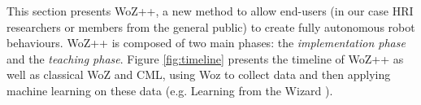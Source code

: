 \documentclass[manuscript, review, anonymous]{acmart}
\newcommand{\ES}[1]{\added[id=ES]{#1}}
\newcommand{\woz}{WoZ++\xspace}
\begin{document}


%	


This section presents \woz, a new method to allow end-users (in our case HRI
researchers or members from the general public) to create fully autonomous robot
behaviours. \woz is composed of two main phases: the \emph{implementation phase} and the \emph{teaching phase}. Figure \ref{fig:timeline} presents the timeline of \woz as well as classical WoZ and CML, using Woz to collect data and then applying machine learning on these data (e.g. Learning from the Wizard \cite{knox2016learning}).


\end{document}
